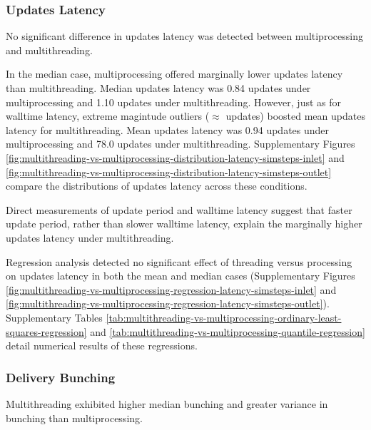 \subsubsection{Updates Latency}

No significant difference in updates latency was detected between multiprocessing and multithreading.

In the median case, multiprocessing offered marginally lower updates latency than multithreading.
Median updates latency was 0.84 updates under multiprocessing and 1.10 updates under multithreading.
However, just as for walltime latency, extreme magintude outliers ($\approx$  updates) boosted mean updates latency for multithreading.
Mean updates latency was 0.94 updates under multiprocessing and 78.0 updates under multithreading.
Supplementary Figures \ref{fig:multithreading-vs-multiprocessing-distribution-latency-simsteps-inlet} and \ref{fig:multithreading-vs-multiprocessing-distribution-latency-simsteps-outlet} compare the distributions of updates latency across these conditions.

Direct measurements of update period and walltime latency suggest that faster update period, rather than slower walltime latency, explain the marginally higher updates latency under multithreading.

Regression analysis detected no significant effect of threading versus processing on updates latency in both the mean and median cases (Supplementary Figures \ref{fig:multithreading-vs-multiprocessing-regression-latency-simsteps-inlet} and \ref{fig:multithreading-vs-multiprocessing-regression-latency-simsteps-outlet}).
Supplementary Tables \ref{tab:multithreading-vs-multiprocessing-ordinary-least-squares-regression} and \ref{tab:multithreading-vs-multiprocessing-quantile-regression} detail numerical results of these regressions.

\subsubsection{Delivery Bunching}

Multithreading exhibited higher median bunching and greater variance in bunching than multiprocessing.

